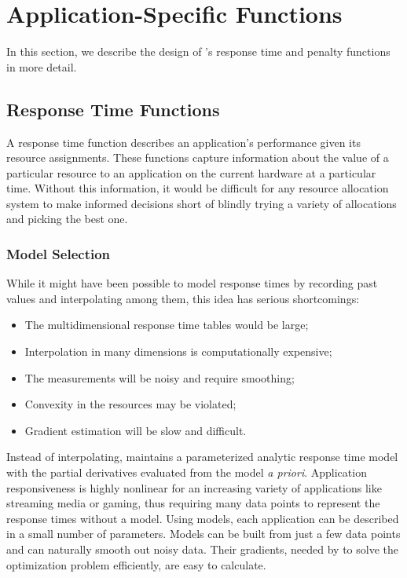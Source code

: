 \section{Application-Specific Functions}\label{app_func}


In this section, we describe the design of \pacora's response time and penalty functions in more detail.

\subsection*{Response Time Functions}
A response time function describes an application's performance given its resource assignments.  These functions capture information about the value of a particular resource to an application on the current hardware at a particular time. Without this information, it would be difficult for any resource allocation system to make informed decisions short of blindly trying a variety of allocations and picking the best one.

\subsubsection*{Model Selection} While it might have been possible to model response times by recording past values and interpolating among them, this idea has serious shortcomings:
\begin{itemize}
\item The multidimensional response time tables would be large;
\item Interpolation in many dimensions is computationally expensive;
\item The measurements will be noisy and require smoothing;
\item Convexity in the resources may be violated;
\item Gradient estimation will be slow and difficult.
\end{itemize}

Instead of interpolating, \pacora maintains a parameterized analytic response time model with the partial derivatives evaluated from the model \emph{a priori}. Application responsiveness is highly nonlinear for an increasing variety of applications like streaming media or gaming, thus requiring many data points to represent the response times without a model. Using models, each application can be described in a small number of parameters.  Models can be built from just a few data points and can naturally smooth out noisy data. Their gradients, needed by \pacora to solve the optimization problem efficiently, are easy to calculate.

